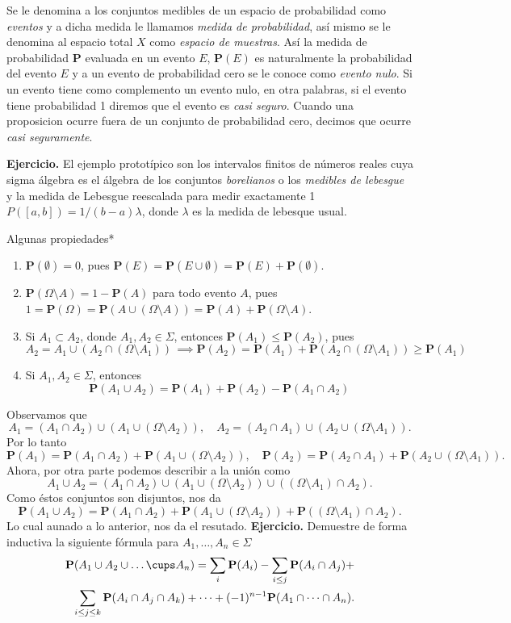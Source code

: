 \documentclass[letterpaper]{book}
\newcommand{\prob}{\textbf{P}}
\newcommand{\eje}{{\newline \noindent \sc \textbf{Ejercicio. }}}
\newcommand{\dem}{{\noindent \sc Demostraci\'on. }}
\newcommand{\om}{\ensuremath{\Omega}}
\newcommand{\sig}{\ensuremath{\Sigma}}
\begin{document}
Se le denomina a los conjuntos medibles de un espacio de probabilidad como \emph{eventos} y a dicha medida le llamamos \emph{medida de probabilidad}, así mismo se le denomina al espacio total \(X\) como \emph{espacio de muestras}. Así la medida de probabilidad \textbf{P} evaluada en un evento \(E\), \(\prob(E)\) es naturalmente la probabilidad del evento \(E\) y a un evento de probabilidad cero se le conoce como \emph{evento nulo}. Si un evento tiene como complemento un evento nulo, en otra palabras, si el evento tiene probabilidad 1 diremos que el evento es \emph{casi seguro}. Cuando una proposicion ocurre fuera de un conjunto de probabilidad cero, decimos que ocurre \emph{casi seguramente}.

\eje El ejemplo prototípico son los intervalos finitos de números reales cuya sigma álgebra es el álgebra de los conjuntos \emph{borelianos} o los \emph{medibles de lebesgue} y la medida de Lebesgue reescalada para medir exactamente 1 \(P([a,b])=1/(b-a)\lambda\), donde \(\lambda\) es la medida de lebesque usual.


\noindent \big*Algunas propiedades*

\begin{enumerate}
\item \(\prob(\emptyset)=0\), pues \(\prob(E)=\prob(E\cup\emptyset)=\prob(E)+\prob(\emptyset)\).
\item \(\prob(\om\setminus A)=1-\prob(A)\) para todo evento \(A\), pues \(1=\prob(\om)=\prob(A\cup(\om\setminus A))=\prob(A)+\prob(\om\setminus A)\).
\item Si \(A_1\subset A_2\), donde \(A_1,A_2\in\sig\), entonces \(\prob(A_1)\leq\prob(A_2)\), pues
\[
   A_2=A_1\cup(A_2\cap(\om\setminus A_1))\,\implies\prob(A_2)=\prob(A_1)+\prob(A_2\cap(\om\setminus A_1))\geq\prob(A_1)
   \]
\item Si \(A_1,A_2\in\sig\), entonces
\[
   \prob(A_1\cup A_2)=\prob(A_1)+\prob(A_2)-\prob(A_1\cap A_2)
   \]
\end{enumerate}
\noindent\dem Observamos que
\[
A_1=(A_1\cap A_2)\cup(A_1\cup(\om\setminus A_2)),\quad A_2=(A_2\cap A_1)\cup(A_2\cup(\om\setminus A_1)).
\]
Por lo tanto
\[
\prob(A_1)=\prob(A_1\cap A_2)+\prob(A_1\cup(\om\setminus A_2)),\quad \prob(A_2)=\prob(A_2\cap A_1)+\prob(A_2\cup(\om\setminus A_1)).
\]
Ahora, por otra parte podemos describir a la unión como 
\[
A_1\cup A_2=(A_1\cap A_2)\cup(A_1\cup(\om\setminus A_2))\cup((\om\setminus A_1)\cap A_2).
\]
Como éstos conjuntos son disjuntos, nos da
\[
\prob(A_1\cup A_2)=\prob(A_1\cap A_2)+\prob(A_1\cup(\om\setminus A_2))+\prob((\om\setminus A_1)\cap A_2).
\]
Lo cual aunado a lo anterior, nos da el resutado.
\eje Demuestre de forma inductiva la siguiente fórmula para \(A_1,\dots,A_n\in\sig\)
\begin{align*}
\prob(A_1\cup A_2\cup\dots\cups A_n)=\sum_{i}\prob(A_i)-\sum_{i\leq j}\prob(A_i\cap A_j)+\\
\sum_{i\leq j\leq k}\prob(A_i\cap A_j\cap A_k)+\cdots+(-1)^{n-1}\prob(A_1\cap\dots\cap A_n).
\end{align*}
\end{document}
